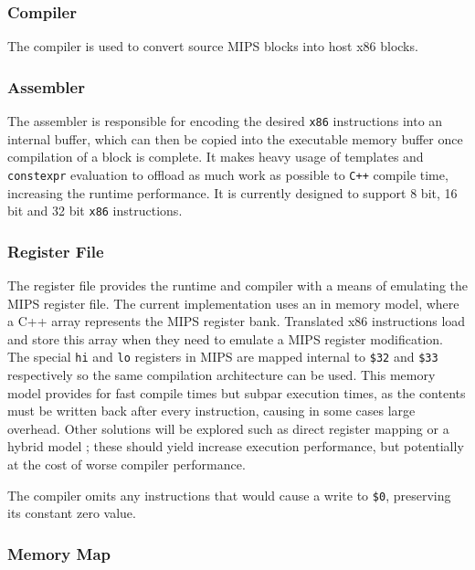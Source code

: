 \subsubsection{Compiler}

The compiler is used to convert source MIPS blocks into host x86 blocks.

\subsubsection{Assembler}

The assembler is responsible for encoding the desired \texttt{x86} instructions into an internal buffer, which can then be copied into the executable memory buffer once compilation of a block is complete. It makes heavy usage of templates and \texttt{constexpr} evaluation to offload as much work as possible to \texttt{C++} compile time, increasing the runtime performance. It is currently designed to support 8 bit, 16 bit and 32 bit \texttt{x86} instructions.

\subsubsection{Register File}

The register file provides the runtime and compiler with a means of emulating the MIPS register file. The current implementation uses an in memory model, where a C++ array represents the MIPS register bank. Translated x86 instructions load and store this array when they need to emulate a MIPS register modification. The special \texttt{hi} and \texttt{lo} registers in MIPS are mapped internal to \texttt{\$32} and \texttt{\$33} respectively so the same compilation architecture can be used. This memory model provides for fast compile times but subpar execution times, as the contents must be written back after every instruction, causing in some cases large overhead. Other solutions will be explored such as direct register mapping or a hybrid model \cite{mark-probst-dbt}; these should yield increase execution performance, but potentially at the cost of worse compiler performance.

The compiler omits any instructions that would cause a write to \texttt{\$0}, preserving its constant zero value.

\subsubsection{Memory Map}

